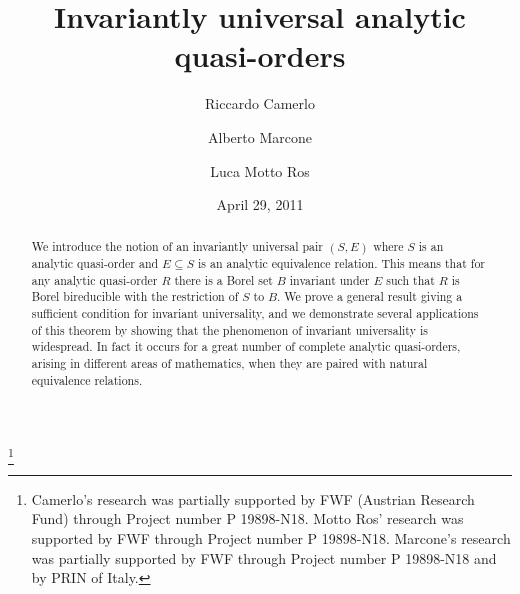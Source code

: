 \documentclass{amsart}
\theoremstyle{definition}
\theoremstyle{remark}
\begin{document}
\title{Invariantly universal analytic quasi-orders}
\date{April 29, 2011}
\author{Riccardo Camerlo}
\address{Dipartimento di Matematica,
Politecnico di Torino,
corso Duca degli Abruzzi 24,
10129 Torino,
Italy}

\author{Alberto Marcone}
    \address{Dipartimento di Matematica e Informatica,
    Universit\`{a} di Udine,
    viale delle Scienze 206,
    33100 Udine,
    Italy}

\author{Luca Motto Ros}
\address{Kurt G\"odel Research Center for Mathematical Logic\\
  University of Vienna \\ W\"ahringer Stra{\ss}e 25 \\
 A-1090 Vienna \\
Austria}
\thanks{Camerlo's research was partially supported by FWF (Austrian Research
  Fund) through Project number P 19898-N18. Motto Ros' research was supported by FWF  through Project number P 19898-N18. Marcone's research was partially supported by FWF through Project number P 19898-N18 and by PRIN of Italy.}

\begin{abstract}
We introduce the notion of an invariantly universal pair $(S,E)$ where $S$ is an analytic quasi-order and $E\subseteq S$ is an analytic equivalence relation.
This means that for any analytic quasi-order $R$ there is a Borel set $B$ invariant under $E$ such that $R$ is Borel bireducible with the restriction of $S$ to $B$.
We prove a general result giving a sufficient condition for invariant universality, and we demonstrate several applications of this theorem by showing that the phenomenon of invariant universality is widespread.
In fact it occurs for a great number of complete analytic quasi-orders, arising in different areas of mathematics, when they are paired with natural equivalence relations.
\end{abstract}
\end{document}

